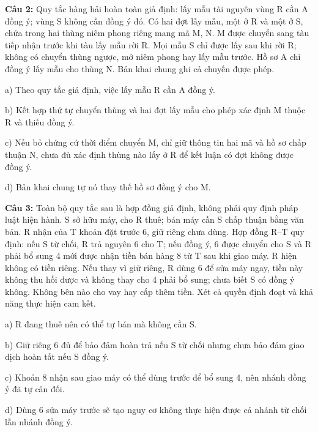 \documentclass[12pt,a4paper]{article}
\begin{document}
\par\noindent\begin{minipage}{\linewidth}
\noindent\textbf{Câu 2:} Quy tắc hàng hải hoàn toàn giả định: lấy mẫu tài nguyên vùng R cần A đồng ý; vùng S không cần đồng ý đó. Có hai đợt lấy mẫu, một ở R và một ở S, chứa trong hai thùng niêm phong riêng mang mã M, N. M được chuyển sang tàu tiếp nhận trước khi tàu lấy mẫu rời R. Mọi mẫu S chỉ được lấy sau khi rời R; không có chuyển thùng ngược, mở niêm phong hay lấy mẫu trước. Hồ sơ A chỉ đồng ý lấy mẫu cho thùng N. Bản khai chung ghi cả chuyến được phép.\par
\noindent a) Theo quy tắc giả định, việc lấy mẫu R cần A đồng ý.\par
\noindent b) Kết hợp thứ tự chuyển thùng và hai đợt lấy mẫu cho phép xác định M thuộc R và thiếu đồng ý.\par
\noindent c) Nếu bỏ chứng cứ thời điểm chuyển M, chỉ giữ thông tin hai mã và hồ sơ chấp thuận N, chưa đủ xác định thùng nào lấy ở R để kết luận có đợt không được đồng ý.\par
\noindent d) Bản khai chung tự nó thay thế hồ sơ đồng ý cho M.\par
\end{minipage}\par\vspace{0.12cm}

\par\noindent\begin{minipage}{\linewidth}
\noindent\textbf{Câu 3:} Toàn bộ quy tắc sau là hợp đồng giả định, không phải quy định pháp luật hiện hành. S sở hữu máy, cho R thuê; bán máy cần S chấp thuận bằng văn bản. R nhận của T khoản đặt trước 6, giữ riêng chưa dùng. Hợp đồng R--T quy định: nếu S từ chối, R trả nguyên 6 cho T; nếu đồng ý, 6 được chuyển cho S và R phải bổ sung 4 mới được nhận tiền bán hàng 8 từ T sau khi giao máy. R hiện không có tiền riêng. Nếu thay vì giữ riêng, R dùng 6 để sửa máy ngay, tiền này không thu hồi được và không thay cho 4 phải bổ sung; chưa biết S có đồng ý không. Không bên nào cho vay hay cấp thêm tiền. Xét cả quyền định đoạt và khả năng thực hiện cam kết.\par
\noindent a) R đang thuê nên có thể tự bán mà không cần S.\par
\noindent b) Giữ riêng 6 đủ để bảo đảm hoàn trả nếu S từ chối nhưng chưa bảo đảm giao dịch hoàn tất nếu S đồng ý.\par
\noindent c) Khoản 8 nhận sau giao máy có thể dùng trước để bổ sung 4, nên nhánh đồng ý đã tự cân đối.\par
\noindent d) Dùng 6 sửa máy trước sẽ tạo nguy cơ không thực hiện được cả nhánh từ chối lẫn nhánh đồng ý.\par
\end{minipage}\par\vspace{0.12cm}
\end{document}
